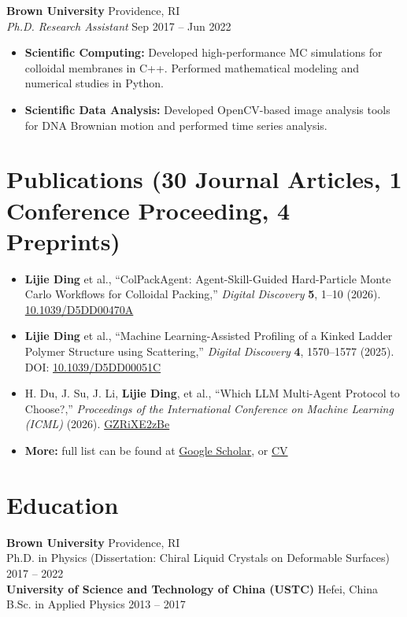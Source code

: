 \documentclass[11pt,letterpaper]{article}
\begin{document}
\textbf{Brown University} \hfill Providence, RI \\
\textit{Ph.D. Research Assistant} \hfill Sep 2017 -- Jun 2022
\begin{itemize}[leftmargin=*]
    \item \textbf{Scientific Computing:} Developed high-performance MC simulations for colloidal membranes in C++. Performed mathematical modeling and numerical studies in Python.
    \item \textbf{Scientific Data Analysis:} Developed OpenCV-based image analysis tools for DNA Brownian motion and performed time series analysis.
\end{itemize}


\section*{Publications \normalsize{(30 Journal Articles, 1 Conference Proceeding, 4 Preprints)}}

\begin{itemize}[leftmargin=*, label={}]
    \item \textbf{Lijie Ding} et al., ``{ColPackAgent}: Agent-Skill-Guided Hard-Particle Monte Carlo Workflows for Colloidal Packing,'' \textit{Digital Discovery} \textbf{5}, 1--10 (2026). \href{https://doi.org/10.1039/D5DD00470A}{10.1039/D5DD00470A}
    \item \textbf{Lijie Ding} et al., ``Machine Learning-Assisted Profiling of a Kinked Ladder Polymer Structure using Scattering,'' \textit{Digital Discovery} \textbf{4}, 1570--1577 (2025). DOI: \href{https://doi.org/10.1039/D5DD00051C}{10.1039/D5DD00051C}
    \item H. Du, J. Su, J. Li, \textbf{Lijie Ding}, et al., ``Which {LLM} Multi-Agent Protocol to Choose?,'' \textit{Proceedings of the International Conference on Machine Learning (ICML)} (2026). \href{https://openreview.net/forum?id=GZRiXE2zBe}{GZRiXE2zBe}
    \item \textbf{More:} full list can be found at \href{https://scholar.google.com/citations?user=i-U0wBsAAAAJ&hl=en&oi=ao}{Google Scholar}, or \href{https://ljding94.github.io/file/cv_resume/cv_lding.pdf}{CV}
\end{itemize}

\section*{Education}
\textbf{Brown University} \hfill Providence, RI \\
Ph.D. in Physics (Dissertation: Chiral Liquid Crystals on Deformable Surfaces) \hfill 2017 -- 2022 \\
\textbf{University of Science and Technology of China (USTC)} \hfill Hefei, China \\
B.Sc. in Applied Physics \hfill 2013 -- 2017
\end{document}
